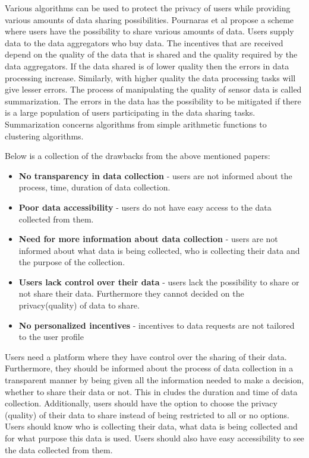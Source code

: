 Various algorithms can be used to protect the privacy of users while providing various amounts of data sharing possibilities. Pournaras et al \cite{pournaras2016self} propose a scheme where users have the possibility to share various amounts of data. Users supply data to the data aggregators who buy data. The incentives that are received depend on the quality of the data that is shared and the quality required by the data aggregators. If the data shared is of lower quality then the errors in data processing increase. Similarly, with higher quality the data processing tasks will give lesser errors. The process of manipulating the quality of sensor data is called summarization. The errors in the data has the possibility to be mitigated if there is a large population of users participating in the data sharing tasks. Summarization concerns algorithms from simple arithmetic functions to clustering algorithms.

Below is a collection of the drawbacks from the above mentioned papers:
\begin{itemize}
\item \textbf{No transparency in data collection} - users are not informed about the process, time, duration of data collection.
\item \textbf{Poor data accessibility} -  users do not have easy access to the data collected from them.
\item \textbf{Need for more information about data collection} - users are not informed about what data is being collected, who is collecting their data and the purpose of the collection.
\item \textbf{Users lack control over their data} - users lack the possibility to share or not share their data. Furthermore they cannot decided on the privacy(quality) of data to share.
\item \textbf{No personalized incentives} - incentives to data requests are not tailored to the user profile
\end{itemize}

Users need a platform where they have control over the sharing of their data. Furthermore, they should be informed about the process of data collection in a transparent manner by being given all the information needed to make a decision, whether to share their data or not. This in cludes the duration and time of data collection. Additionally, users should have the option to choose the privacy (quality) of their data to share instead of being restricted to all or no options. Users should know who is collecting their data, what data is being collected and for what purpose this data is used. Users should also have easy accessibility to see the data collected from them.

